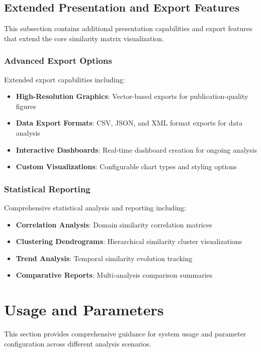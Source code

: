 \subsection{Extended Presentation and Export Features}
\label{subsec:more-presentation}

This subsection contains additional presentation capabilities and export features that extend the core similarity matrix visualization.

\subsubsection{Advanced Export Options}
Extended export capabilities including:
\begin{itemize}
    \item \textbf{High-Resolution Graphics}: Vector-based exports for publication-quality figures
    \item \textbf{Data Export Formats}: CSV, JSON, and XML format exports for data analysis
    \item \textbf{Interactive Dashboards}: Real-time dashboard creation for ongoing analysis
    \item \textbf{Custom Visualizations}: Configurable chart types and styling options
\end{itemize}

\subsubsection{Statistical Reporting}
Comprehensive statistical analysis and reporting including:
\begin{itemize}
    \item \textbf{Correlation Analysis}: Domain similarity correlation matrices
    \item \textbf{Clustering Dendrograms}: Hierarchical similarity cluster visualizations
    \item \textbf{Trend Analysis}: Temporal similarity evolution tracking
    \item \textbf{Comparative Reports}: Multi-analysis comparison summaries
\end{itemize}

\section{Usage and Parameters}
\label{sec:usage-parameters}

This section provides comprehensive guidance for system usage and parameter configuration across different analysis scenarios.

